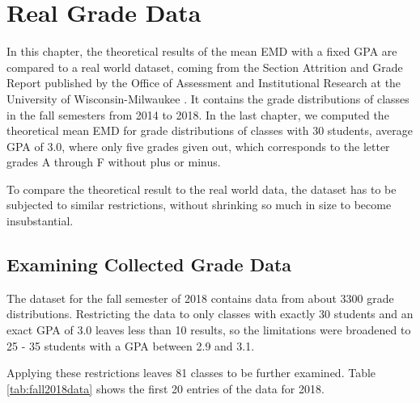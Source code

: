 \documentclass[12pt,letterpaper,oneside,openany]{book}
\begin{document}
\chapter{Real Grade Data}
In this chapter, the theoretical results of the mean EMD with a fixed GPA are compared to  a real world dataset, coming from the Section Attrition and Grade Report published by the Office of Assessment and Institutional Research at the University of Wisconsin-Milwaukee \cite{gradeData}. It contains the grade distributions of classes in the fall semesters from 2014 to 2018.
In the last chapter, we computed the theoretical mean EMD for grade distributions of classes with 30 students, average GPA of 3.0, where only five  grades given out, which corresponds to the letter grades A through F without plus or minus.

To compare the theoretical result to the real world data, the dataset has to be subjected to similar restrictions, without shrinking so much in size to become insubstantial.


\setcounter{section}{0}
\section{Examining Collected Grade Data}
The dataset for the fall semester of 2018 contains data from about 3300 grade distributions. Restricting the data to only classes with exactly 30 students and an exact GPA of 3.0 leaves less than 10 results, so the limitations were broadened to 25 - 35 students with a GPA between 2.9 and 3.1. 

Applying these restrictions leaves 81 classes to be further examined. 
Table \ref{tab:fall2018data} shows the first 20 entries of the data for 2018.
\end{document}
